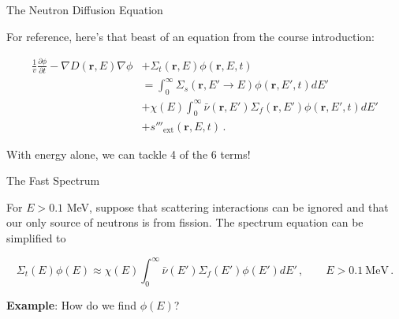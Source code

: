 \documentclass[aspectratio=1610]{beamer}
\begin{document}
\begin{frame}[fragile]{The Neutron Diffusion Equation}

For reference, here's that beast of an equation from the course introduction:
 
\begin{align*}
\frac{1}{v} \frac{\partial \phi}{\partial t}
 - \nabla D(\mathbf{r}, E) \nabla \phi 
  &+ \Sigma_t(\mathbf{r}, E) \phi(\mathbf{r}, E, t) \\
  &= \int^{\infty}_0 \Sigma_s(\mathbf{r}, E'\to E) \phi(\mathbf{r}, E', t) dE' \\
  &+  \chi(E)  \int^{\infty}_0 \bar{\nu}(\mathbf{r}, E')\Sigma_f(\mathbf{r}, E') \phi(\mathbf{r}, E', t) dE' \\
  &+ s'''_{\text{ext}}(\mathbf{r}, E, t) \, .
\end{align*}
 
With energy alone, we can tackle 4 of the 6 terms!
 
\end{frame}
 
\begin{frame}[fragile]{The Fast Spectrum}

For $E > 0.1$ MeV, suppose that scattering interactions can be ignored and that our 
only source of neutrons is from fission.  The 
spectrum equation can be simplified to

\begin{equation*}
 \Sigma_t(E) \phi(E) \approx \chi(E) \int^{\infty}_0 \bar{\nu}(E')\Sigma_f(E') \phi(E') dE' \, , \qquad E > 0.1~\text{MeV} \, .
\end{equation*}

\vfill 
\pause 

{\bf Example}: How do we find $\phi(E)$?


\end{frame}
\end{document}
